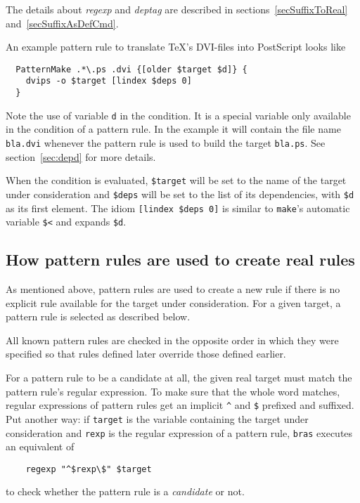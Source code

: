 \documentclass[11pt,bibtotoc,idxtotoc]{scrreprt}
\makeatletter
\newcommand{\bras}{\texttt{bras}}
\newcommand{\make}{\texttt{make}}
\newcommand{\Indextt}[1]{\texttt{#1}\index{#1@\texttt{#1}}}
\makeatother
\begin{document}
The details about \textit{regexp} and \textit{deptag} are described
in sections~\ref{secSuffixToReal} and~\ref{secSuffixAsDefCmd}.

An example pattern rule to translate \TeX's DVI-files into PostScript
looks like
\begin{verbatim}
  PatternMake .*\.ps .dvi {[older $target $d]} {
    dvips -o $target [lindex $deps 0]
  }
\end{verbatim}
Note the use of variable \Indextt{d} in the condition. It is a special
variable only available in the condition of a pattern rule. In the
example it will contain the file name \texttt{bla.dvi} whenever the
pattern rule is used to build the target \texttt{bla.ps}. See
section~\ref{sec:depd} for more details.

When the condition is evaluated, \texttt{\$target} will be set to the
name of the target under consideration and \texttt{\$deps} will be set
to the list of its dependencies, with \texttt{\$d} as its first
element. The idiom \texttt{[lindex \$deps 0]} is similar to \make's
automatic variable \texttt{\$<} and expands \texttt{\$d}.


\subsection{How pattern rules are used to create real rules}
\label{secSuffixToReal}

As mentioned above, pattern rules are used to create a new rule if
there is no explicit rule available for the target under
consideration.  For a given target, a pattern rule is selected as
described below.

All known pattern rules are checked in the opposite order in which
they were specified so that rules defined later override those defined
earlier.

For a pattern rule to be a candidate at all, the given real target
must match the pattern rule's regular expression. To make sure that
the whole word matches, regular expressions of pattern rules get an
implicit \verb+^+ and \texttt{\$} prefixed and suffixed. Put another
way: if \texttt{target} is the variable containing the target under
consideration and \texttt{rexp} is the regular expression of a pattern
rule, \bras{} executes an equivalent of
\begin{verbatim}
    regexp "^$rexp\$" $target
\end{verbatim}
to check whether the pattern rule is a \textit{candidate} or not.
\end{document}
